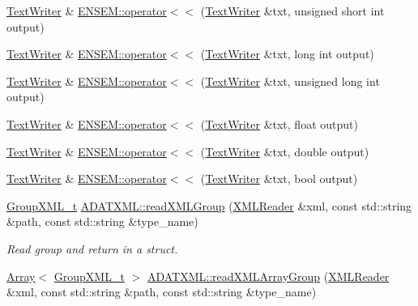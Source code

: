 \begin{DoxyCompactItemize}
\mbox{\hyperlink{classENSEM_1_1TextWriter}{Text\+Writer}} \& \mbox{\hyperlink{group__io_ga1d2f1326c7e1471ec11e3290bca05276}{E\+N\+S\+E\+M\+::operator$<$$<$}} (\mbox{\hyperlink{classENSEM_1_1TextWriter}{Text\+Writer}} \&txt, unsigned short int output)
\item 
\mbox{\hyperlink{classENSEM_1_1TextWriter}{Text\+Writer}} \& \mbox{\hyperlink{group__io_ga8d4e5827a00d9bf9fd96b669720052d1}{E\+N\+S\+E\+M\+::operator$<$$<$}} (\mbox{\hyperlink{classENSEM_1_1TextWriter}{Text\+Writer}} \&txt, long int output)
\item 
\mbox{\hyperlink{classENSEM_1_1TextWriter}{Text\+Writer}} \& \mbox{\hyperlink{group__io_gabb890a87f7dab1b0e731aaf8b8c3a681}{E\+N\+S\+E\+M\+::operator$<$$<$}} (\mbox{\hyperlink{classENSEM_1_1TextWriter}{Text\+Writer}} \&txt, unsigned long int output)
\item 
\mbox{\hyperlink{classENSEM_1_1TextWriter}{Text\+Writer}} \& \mbox{\hyperlink{group__io_ga0e07b49d2a54640fc8aa6cdeed40005a}{E\+N\+S\+E\+M\+::operator$<$$<$}} (\mbox{\hyperlink{classENSEM_1_1TextWriter}{Text\+Writer}} \&txt, float output)
\item 
\mbox{\hyperlink{classENSEM_1_1TextWriter}{Text\+Writer}} \& \mbox{\hyperlink{group__io_ga77263e95f4f5d264142cf805ef1fc01f}{E\+N\+S\+E\+M\+::operator$<$$<$}} (\mbox{\hyperlink{classENSEM_1_1TextWriter}{Text\+Writer}} \&txt, double output)
\item 
\mbox{\hyperlink{classENSEM_1_1TextWriter}{Text\+Writer}} \& \mbox{\hyperlink{group__io_ga4bb4e9f2c0da52dbce22280b6b00e35d}{E\+N\+S\+E\+M\+::operator$<$$<$}} (\mbox{\hyperlink{classENSEM_1_1TextWriter}{Text\+Writer}} \&txt, bool output)
\item 
\mbox{\hyperlink{structADATXML_1_1GroupXML__t}{Group\+X\+M\+L\+\_\+t}} \mbox{\hyperlink{group__io_ga55d25898ac653a77ea446bee3682d29b}{A\+D\+A\+T\+X\+M\+L\+::read\+X\+M\+L\+Group}} (\mbox{\hyperlink{classADATXML_1_1XMLReader}{X\+M\+L\+Reader}} \&xml, const std\+::string \&path, const std\+::string \&type\+\_\+name)
\begin{DoxyCompactList}\small\item\em Read group and return in a struct. \end{DoxyCompactList}\item 
\mbox{\hyperlink{classXMLArray_1_1Array}{Array}}$<$ \mbox{\hyperlink{structADATXML_1_1GroupXML__t}{Group\+X\+M\+L\+\_\+t}} $>$ \mbox{\hyperlink{group__io_gadf35620dfa0c46f11572a9ffb3452847}{A\+D\+A\+T\+X\+M\+L\+::read\+X\+M\+L\+Array\+Group}} (\mbox{\hyperlink{classADATXML_1_1XMLReader}{X\+M\+L\+Reader}} \&xml, const std\+::string \&path, const std\+::string \&type\+\_\+name)

\end{DoxyCompactItemize}

